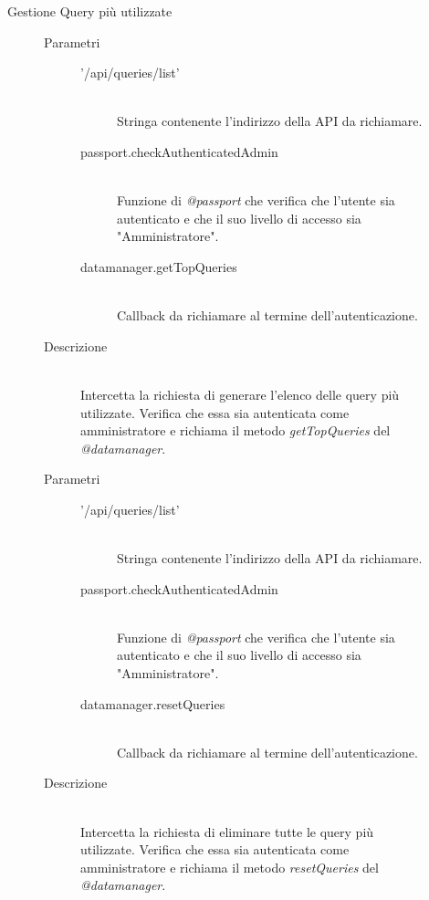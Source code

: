 \begin{description}
\begin{description}
\begin{mldescription}
  \end{mldescription}    
 
 \item[Gestione Query più utilizzate]
 \begin{mldescription}
     \hfill 
    \begin{description}
    \item[Parametri] \hfill
     \begin{description}
      \item['/api/queries/list'] \hfill \\
      Stringa contenente l'indirizzo della API da richiamare.
      \item[passport.checkAuthenticatedAdmin] \hfill \\
      Funzione di \textit{@passport} che verifica che l'utente sia autenticato e che il suo livello di accesso sia "Amministratore".
      \item[datamanager.getTopQueries] \hfill \\
      Callback da richiamare al termine dell'autenticazione.
     \end{description}
    \item[Descrizione] \hfill \\
    Intercetta la richiesta di generare l'elenco delle query più utilizzate. Verifica che essa sia autenticata come amministratore e richiama il metodo \textit{getTopQueries} del \textit{@datamanager}.
    \end{description}
    
     \hfill 
    \begin{description}
    \item[Parametri] \hfill
     \begin{description}
      \item['/api/queries/list'] \hfill \\
      Stringa contenente l'indirizzo della API da richiamare.
      \item[passport.checkAuthenticatedAdmin] \hfill \\
      Funzione di \textit{@passport} che verifica che l'utente sia autenticato e che il suo livello di accesso sia "Amministratore".
      \item[datamanager.resetQueries] \hfill \\
      Callback da richiamare al termine dell'autenticazione.
     \end{description}
    \item[Descrizione] \hfill \\
    Intercetta la richiesta di eliminare tutte le query più utilizzate. Verifica che essa sia autenticata come amministratore e richiama il metodo \textit{resetQueries} del \textit{@datamanager}.
    \end{description}
 

\end{mldescription}
\end{description}
\end{description}
